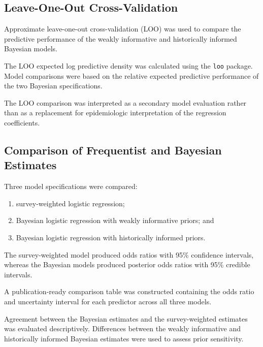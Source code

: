 \documentclass[12pt]{article}
\begin{document}
\subsection{Leave-One-Out Cross-Validation}

Approximate leave-one-out cross-validation (LOO) was used to compare the predictive performance of the weakly informative and historically informed Bayesian models.

The LOO expected log predictive density was calculated using the \texttt{loo} package. Model comparisons were based on the relative expected predictive performance of the two Bayesian specifications.

The LOO comparison was interpreted as a secondary model evaluation rather than as a replacement for epidemiologic interpretation of the regression coefficients.


\subsection{Comparison of Frequentist and Bayesian Estimates}

Three model specifications were compared:

\begin{enumerate}
    \item survey-weighted logistic regression;
    \item Bayesian logistic regression with weakly informative priors; and
    \item Bayesian logistic regression with historically informed priors.
\end{enumerate}

The survey-weighted model produced odds ratios with 95\% confidence intervals, whereas the Bayesian models produced posterior odds ratios with 95\% credible intervals.

A publication-ready comparison table was constructed containing the odds ratio and uncertainty interval for each predictor across all three models.

Agreement between the Bayesian estimates and the survey-weighted estimates was evaluated descriptively. Differences between the weakly informative and historically informed Bayesian estimates were used to assess prior sensitivity.

\end{document}
